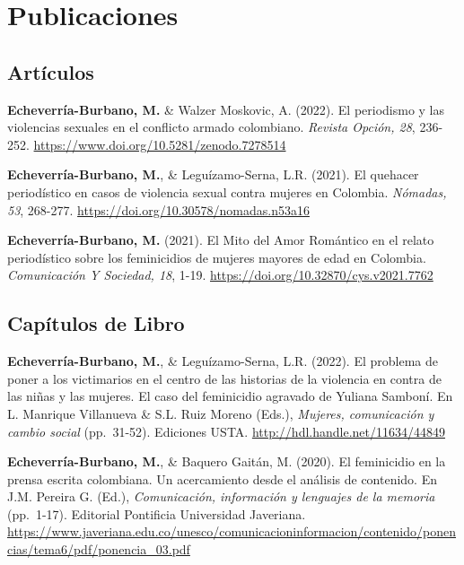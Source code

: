 \documentclass[11pt,a4paper,]{awesome-cv}
\begin{document}
\hypertarget{publicaciones}{%
\section{Publicaciones}\label{publicaciones}}

\hypertarget{section}{%
\subsection{\texorpdfstring{\textbf{Artículos}}{}}\label{section}}

\begingroup
\setlength{\parindent}{-0.5in}
\setlength{\leftskip}{0.5in}

\textbf{Echeverría-Burbano, M.} \& Walzer Moskovic, A. (2022). El
periodismo y las violencias sexuales en el conflicto armado colombiano.
\emph{Revista Opción, 28}, 236-252.
\url{https://www.doi.org/10.5281/zenodo.7278514}

\textbf{Echeverría-Burbano, M.}, \& Leguízamo-Serna, L.R. (2021). El
quehacer periodístico en casos de violencia sexual contra mujeres en
Colombia. \emph{Nómadas, 53}, 268-277.
\url{https://doi.org/10.30578/nomadas.n53a16}

\textbf{Echeverría-Burbano, M.} (2021). El Mito del Amor Romántico en el
relato periodístico sobre los feminicidios de mujeres mayores de edad en
Colombia. \emph{Comunicación Y Sociedad, 18}, 1-19.
\url{https://doi.org/10.32870/cys.v2021.7762}

\endgroup

\hypertarget{section-1}{%
\subsection{\texorpdfstring{\textbf{Capítulos de Libro}}{}}\label{section-1}}

\begingroup
\setlength{\parindent}{-0.5in}
\setlength{\leftskip}{0.5in}

\textbf{Echeverría-Burbano, M.}, \& Leguízamo-Serna, L.R. (2022). El
problema de poner a los victimarios en el centro de las historias de la
violencia en contra de las niñas y las mujeres. El caso del feminicidio
agravado de Yuliana Samboní. En L. Manrique Villanueva \& S.L. Ruiz
Moreno (Eds.), \emph{Mujeres, comunicación y cambio social} (pp.~31-52).
Ediciones USTA. \url{http://hdl.handle.net/11634/44849}

\textbf{Echeverría-Burbano, M.}, \& Baquero Gaitán, M. (2020). El
feminicidio en la prensa escrita colombiana. Un acercamiento desde el
análisis de contenido. En J.M. Pereira G. (Ed.), \emph{Comunicación,
información y lenguajes de la memoria} (pp.~1-17). Editorial Pontificia
Universidad Javeriana.
\url{https://www.javeriana.edu.co/unesco/comunicacioninformacion/contenido/ponencias/tema6/pdf/ponencia_03.pdf}
\end{document}
